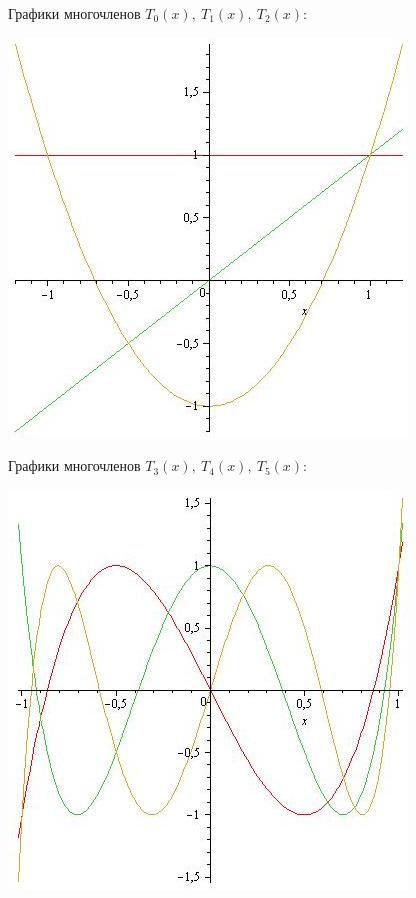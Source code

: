 Графики многочленов $T_0(x),~ T_1(x),~ T_2(x)$:\begin{center}
    \includegraphics[scale=0.5]{T0T1T2.jpg} \end{center}
Графики многочленов $T_3(x),~ T_4(x),~ T_5(x)$:\begin{center}
    \includegraphics[scale=0.5]{T3T4T5.jpg} \end{center}	
